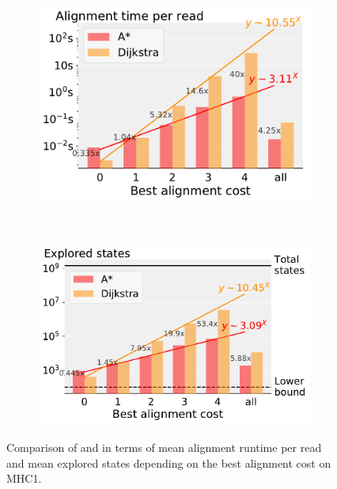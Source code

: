 \begin{figure}[t]
  \begin{subfigure}{.45\textwidth}
    \centering
    \includegraphics[width=\linewidth]{figs/cmp/heuristic_MHC1_cost-t(map).pdf}
  \end{subfigure}~\hspace{1em}
  \begin{subfigure}{.49\textwidth}
    \centering
    \includegraphics[width=\linewidth]{figs/cmp/heuristic_MHC1_cost-explored_states.pdf}
  \end{subfigure}%
  \caption{Comparison of \A and \dijkstra in terms of mean alignment runtime per read and mean explored states depending on the best alignment cost on MHC1.}
  \label{fig:scaling_with_errors}
\end{figure}